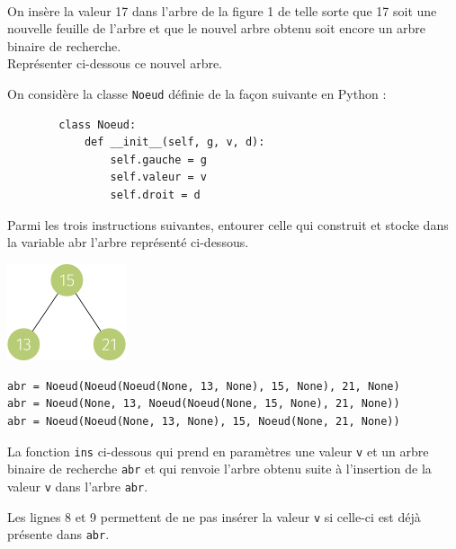 \documentclass[a4paper,12pt,eval,firamath]{nsi}
\begin{document}
\\


On insère la valeur 17 dans l'arbre de la figure 1 de telle sorte que 17 soit une
nouvelle feuille de l'arbre et que le nouvel arbre obtenu soit encore un arbre
binaire de recherche.\\

\question Représenter ci-dessous ce nouvel arbre.\\

On considère la classe \texttt{Noeud} définie de la façon suivante en Python :


\begin{verbatim}
        class Noeud:
            def __init__(self, g, v, d):
                self.gauche = g
                self.valeur = v
                self.droit = d
\end{verbatim}

\question Parmi les trois instructions suivantes, entourer celle qui construit et stocke dans la variable abr l'arbre représenté ci-dessous.
\begin{center}
      \includegraphics[width=3.5cm]{img/fig2}
\end{center}


\begin{verbatim}
abr = Noeud(Noeud(Noeud(None, 13, None), 15, None), 21, None)
abr = Noeud(None, 13, Noeud(Noeud(None, 15, None), 21, None))
abr = Noeud(Noeud(None, 13, None), 15, Noeud(None, 21, None)) 
\end{verbatim}

La fonction \texttt{ins} ci-dessous qui
prend en paramètres une valeur \texttt{v} et un arbre binaire de recherche \texttt{abr} et qui
renvoie l'arbre obtenu suite à l'insertion de la valeur \texttt{v} dans l'arbre \texttt{abr}.

Les lignes 8 et 9 permettent de ne pas insérer la valeur \texttt{v} si celle-ci est déjà présente dans \texttt{abr}.
\end{document}
